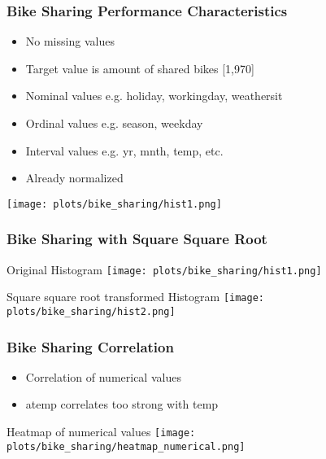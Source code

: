 \documentclass[aspectratio=169]{beamer}
\begin{document}
\begin{frame}{}
\frametitle{Bike Sharing Performance Characteristics}
\begin{minipage}{0.45\textwidth}
\begin{itemize}
\item No missing values
\item Target value is amount of shared bikes [1,970]
\item Nominal values e.g. holiday, workingday, weathersit
\item Ordinal values e.g. season, weekday
\item Interval values e.g. yr, mnth, temp, etc.
\item Already normalized
\end{itemize}
\end{minipage}
\begin{minipage}{0.5\textwidth}
    \texttt{[image: plots/bike\_sharing/hist1.png]}
\end{minipage}
\end{frame}

\begin{frame}
\frametitle{Bike Sharing with Square Square Root}
\begin{minipage}{0.49\textwidth}
	\center Original Histogram
    \texttt{[image: plots/bike\_sharing/hist1.png]}
\end{minipage}
\begin{minipage}{0.49\textwidth}
	\center Square square root transformed Histogram
    \texttt{[image: plots/bike\_sharing/hist2.png]}
\end{minipage}
\end{frame}


\begin{frame}{}
\frametitle{Bike Sharing Correlation}
\begin{minipage}{0.3\textwidth}
\begin{itemize}
\item Correlation of numerical values
\item atemp correlates too strong with temp
\end{itemize}
\end{minipage}
\begin{minipage}{0.69\textwidth}
	\center Heatmap of numerical values
    \texttt{[image: plots/bike\_sharing/heatmap\_numerical.png]}
\end{minipage}
\end{frame}
\end{document}
